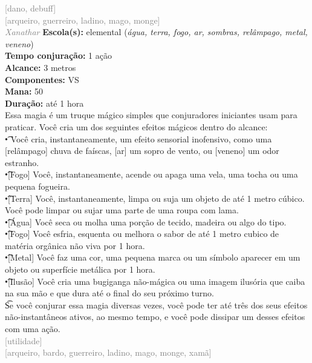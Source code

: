 \documentclass{RPG_Adventure}[2021/10/20]
\begin{document}
{\scriptsize \textcolor{gray}{[dano, debuff]\\}}
{\scriptsize \textcolor{gray}{[arqueiro, guerreiro, ladino, mago, monge]\\}}
{\tiny \textcolor{gray}{\textit{Xanathar}}}\jump{}
{\small \t \textbf{Escola(s):} elemental (\textit{água, terra, fogo, ar, sombras, relâmpago, metal, veneno})\\\t \textbf{Tempo conjuração:} 1 ação\\\t \textbf{Alcance:} 3 metros\\\t \textbf{Componentes:} VS\\\t \textbf{Mana:} 50\\\t \textbf{Duração:} até 1 hora\\}
{\normalsize Essa magia é um truque mágico simples que conjuradores iniciantes usam para praticar. Você cria um dos seguintes efeitos mágicos dentro do alcance:\\\t • Você cria, instantaneamente, um efeito sensorial inofensivo, como uma [relâmpago] chuva de faíscas, [ar] um sopro de vento, ou [veneno] um odor estranho.\\\t •[Fogo] Você, instantaneamente, acende ou apaga uma vela, uma tocha ou uma pequena fogueira.\\\t •[Terra] Você, instantaneamente, limpa ou suja um objeto de até 1 metro cúbico. Você pode limpar ou sujar uma parte de uma roupa com lama.\\\t •[Água] Você seca ou molha uma porção de tecido, madeira ou algo do tipo.\\\t •[Fogo] Você esfria, esquenta ou melhora o sabor de até 1 metro cubico de matéria orgânica não viva por 1 hora.\\\t •[Metal] Você faz uma cor, uma pequena marca ou um símbolo aparecer em um objeto ou superfície metálica por 1 hora.\\\t •[Ilusão] Você cria uma bugiganga não-mágica ou uma imagem ilusória que caiba na sua mão e que dura até o final do seu próximo turno.\\\t Se você conjurar essa magia diversas vezes, você pode ter até três dos seus efeitos não-instantâneos ativos, ao mesmo tempo, e você pode dissipar um desses efeitos com uma ação.\\}
{\scriptsize \textcolor{gray}{[utilidade]\\}}
{\scriptsize \textcolor{gray}{[arqueiro, bardo, guerreiro, ladino, mago, monge, xamã]\\}}
\end{document}
